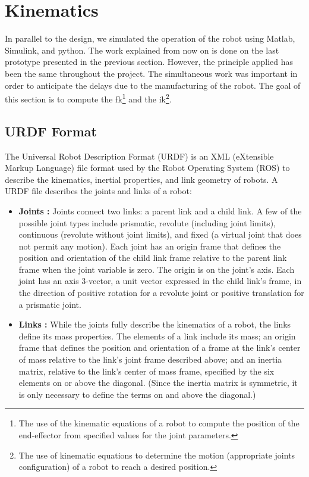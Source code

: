 \section{Kinematics}\insertloftspace
\setcounter{figure}{0}\setcounter{table}{0}

In parallel to the design, we simulated the operation of the robot using Matlab, Simulink, and python. The work explained from now on is done on the last prototype presented in the previous section. However, the principle applied has been the same throughout the project. The simultaneous work was important in order to anticipate the delays due to the manufacturing of the robot. The goal of this section is to compute the \gls{fk}\footnote{The use of the kinematic equations of a robot to compute the position of the end-effector from specified values for the joint parameters.} and the \gls{ik}\footnote{The use of kinematic equations to determine the motion (appropriate joints configuration) of a robot to reach a desired position.}.

\subsection{URDF Format}

The Universal Robot Description Format (URDF) is an XML (eXtensible Markup Language) file format used by the Robot Operating System (ROS) to describe the kinematics, inertial properties, and link geometry of robots. A URDF file describes the joints and links of a robot:

\begin{itemize}
    \item \textbf{Joints :} Joints connect two links: a parent link and a child link. A few of the possible joint types include prismatic, revolute (including joint limits), continuous (revolute without joint limits), and fixed (a virtual joint that does not permit any motion). Each joint has an origin frame that defines the position and orientation of the child link frame relative to the parent link frame when the joint variable is zero. The origin is on the joint's axis. Each joint has an axis 3-vector, a unit vector expressed in the child link's frame, in the direction of positive rotation for a revolute joint or positive translation for a prismatic joint.
    \item \textbf{Links :} While the joints fully describe the kinematics of a robot, the links define its mass properties. The elements of a link include its mass; an origin frame that defines the position and orientation of a frame at the link's center of mass relative to the link's joint frame described above; and an inertia matrix, relative to the link's center of mass frame, specified by the six elements on or above the diagonal. (Since the inertia matrix is symmetric, it is only necessary to define the terms on and above the diagonal.)
\end{itemize}

